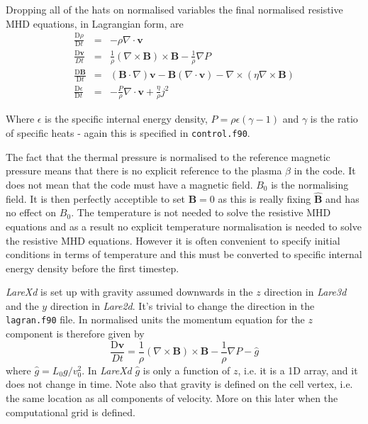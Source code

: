 \documentclass[11pt]{article}
\begin{document}
Dropping all of the hats on normalised variables the final normalised resistive MHD equations, 
in Lagrangian form, are
\begin{eqnarray}
\frac{\mathrm{D}\rho}{\mathrm{D}t}&=&-\rho \nabla\cdot \mathbf{v}\\
\frac{\mathrm{D}\mathbf{v}}{Dt}&=&\frac{1}{\rho}(\nabla\times\mathbf{B})\times\mathbf{B}
-\frac{1}{\rho}\nabla P \label{velocity_eqn}\\
\frac{\mathrm{D}\mathbf{B}}{\mathrm{D}t}&=&(\mathbf{B}\cdot\nabla)\mathbf{v}-\mathbf{B}
(\nabla\cdot\mathbf{v})-\nabla\times(\eta\nabla\times\mathbf{B})\\
\frac{\mathrm{D}\epsilon}{\mathrm{D}t}&=&-\frac{P}{\rho}\nabla\cdot\mathbf{v}+\frac
{\eta}{\rho}j^{2} \label{energy_eqn}
\end{eqnarray}

Where $\epsilon$ is the specific internal energy density, $P = \rho \epsilon(\gamma - 1)$ and 
$\gamma$ is the ratio of specific heats - again this is specified in \texttt{control.f90}.

The fact that the thermal pressure is normalised to the reference magnetic pressure means that 
there is no explicit reference to the 
plasma $\beta$ in the code. It does not mean that the code must have a magnetic field. $B_0$ is 
the normalising field. It is then perfectly acceptible to set $\mathbf{B}=0$ as this is really 
fixing $\hat{\mathbf{B}}$ and has no effect on  $B_0$. The temperature is not needed to solve 
the resistive MHD equations and as a result no explicit temperature normalisation is needed to 
solve the resistive MHD equations. However it is often convenient to specify initial conditions 
in terms of temperature and this must be converted to specific internal energy density before 
the first timestep.

{\it LareXd} is set up with gravity assumed downwards in the $z$ direction in {\it Lare3d} and 
the $y$ direction in {\it Lare2d}. It's trivial to change the direction in the \texttt{lagran.f90} 
file. In normalised units the momentum equation for the $z$ component is therefore given by
\begin{displaymath}
 \frac{\mathrm{D}\mathbf{v}}{Dt}=\frac{1}{\rho}(\nabla\times\mathbf{B})\times\mathbf{B}
-\frac{1}{\rho}\nabla P-\hat{g}
\end{displaymath}
where $\hat{g}=L_0 g / v_0^2$. In {\it LareXd} $\hat{g}$ is only a function of $z$, i.e. it is a 
1D array, and it does not change in time. Note also that gravity is defined on the cell vertex, 
i.e. the same location as all components of velocity. More on this later when the computational 
grid is defined.
\end{document}
